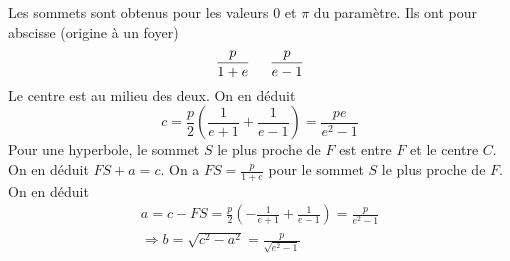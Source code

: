 Les sommets sont obtenus pour les valeurs $0$ et $\pi$ du paramètre. Ils ont pour abscisse (origine à un foyer)
\begin{displaymath}
 \frac{p}{1+e}\hspace{0.5cm} \frac{p}{e-1}
\end{displaymath}
Le centre est au milieu des deux. On en déduit
\begin{displaymath}
 c=\frac{p}{2}\left(\frac{1}{e+1}+\frac{1}{e-1} \right) = \frac{pe}{e^2-1}
\end{displaymath}
Pour une hyperbole, le sommet $S$ le plus proche de $F$ est entre $F$ et le centre $C$. On en déduit $FS + a =c$. On a $FS=\frac{p}{1+e}$ pour le sommet $S$ le plus proche de $F$. On en déduit
\begin{multline*}
 a=c-FS=\frac{p}{2}\left(-\frac{1}{e+1}+\frac{1}{e-1} \right) = \frac{p}{e^2-1}\\
\Rightarrow
b=\sqrt{c^2-a^2}=\frac{p}{\sqrt{e^2-1}}
\end{multline*}
